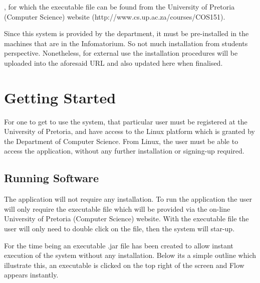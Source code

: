 \documentclass[11pt,a4paper,titlepage]{article}
\begin{document}
		
		, for which the executable file can be found from the University of Pretoria (Computer Science) website (http://www.cs.up.ac.za/courses/COS151). \newline
		
		Since this system is provided by the department, it must be pre-installed in the machines that are in the Infomatorium. So not much installation from students perspective. Nonetheless, for external use the installation procedures will be uploaded into the aforesaid URL and also updated here when finalised. 
		

\section{Getting Started}
	
	For one to get to use the system, that particular user must be registered at the University of Pretoria, and have access to the Linux platform which is granted by the Department of Computer Science. From Linux, the user must be able to access the application, without any further installation or signing-up required.





	
	\subsection{Running Software}
	
	
		The application will not require any installation. To run the application the user will only require the executable file which will be provided via the on-line University of Pretoria (Computer Science) website. With the executable file the user will only need to double click on the file, then the system will star-up.
		
		For the time being an executable .jar file has been created to allow instant execution of the system without any installation. Below its a simple outline which illustrate this, an executable is clicked on the top right of the screen and Flow appears instantly. \newline \newline
		
\end{document}
